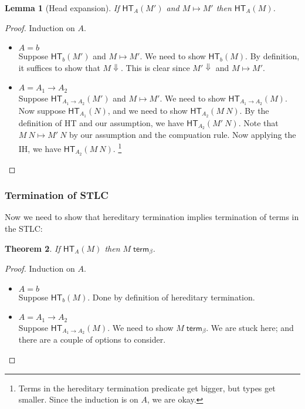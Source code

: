 \documentclass{article}
\newtheorem{thm}{Theorem}
\newtheorem{lem}[thm]{Lemma}
\newcommand{\hterm}[2]{\ensuremath{\mathsf{HT}_{#1}(#2)}}
\newcommand{\termb}[1]{\ensuremath{{#1} \; \mathsf{term}_{\beta}}}
\newcommand{\step}[2]{\ensuremath{#1 \mapsto #2}}
\newcommand{\fn}[2]{\ensuremath{#1 \to #2}}
\newcommand{\ap}[2]{\ensuremath{#1\ #2}}
\begin{document}
\begin{lem}[Head expansion]
  If $\hterm{A}{M'}$ and $\step{M}{M'}$ then $\hterm{A}{M}$.
\end{lem}
\begin{proof}
  Induction on $A$.
  \begin{itemize}
  \setlength\itemsep{1em}
  \item $A = b$\\
    Suppose $\hterm{b}{M'}$ and $\step{M}{M'}$. We need to show $\hterm{b}{M}$. By definition, it suffices to show that $M \Downarrow$. 
    This is clear since $M' \Downarrow$ and $\step{M}{M'}$.
  \item $A = \fn{A_1}{A_2}$\\
    Suppose $\hterm{\fn{A_1}{A_2}}{M'}$ and $\step{M}{M'}$. We need to show $\hterm{\fn{A_1}{A_2}}{M}$.
    Now suppose $\hterm{A_1}{N}$, and we need to show $\hterm{A_2}{\ap{M}{N}}$. 
    By the definition of HT and our assumption, we have $\hterm{A_2}{\ap{M'}{N}}$. 
    Note that $\step{\ap{M}{N}}{\ap{M'}{N}}$ by our assumption and the compuation rule.
    Now applying the IH, we have $\hterm{A_2}{\ap{M}{N}}$.
    \footnote{Terms in the hereditary termination predicate get bigger, but types get smaller. Since the induction 
    is on $A$, we are okay.}
    \qedhere
  \end{itemize}
\end{proof}

\subsubsection{Termination of STLC}

Now we need to show that hereditary termination implies termination of terms in the STLC:
\begin{thm}
  If $\hterm{A}{M}$ then $\termb{M}$.
\end{thm}
\begin{proof}
  Induction on $A$.
   \begin{itemize}
  \setlength\itemsep{1em}
  \item $A = b$\\
    Suppose $\hterm{b}{M}$. Done by definition of hereditary termination.  
  \item $A = \fn{A_1}{A_2}$\\
    Suppose $\hterm{\fn{A_1}{A_2}}{M}$. We need to show $\termb{M}$. We are stuck here; and there are a couple of
    options to consider.
  \end{itemize}
\end{proof}
\end{document}
